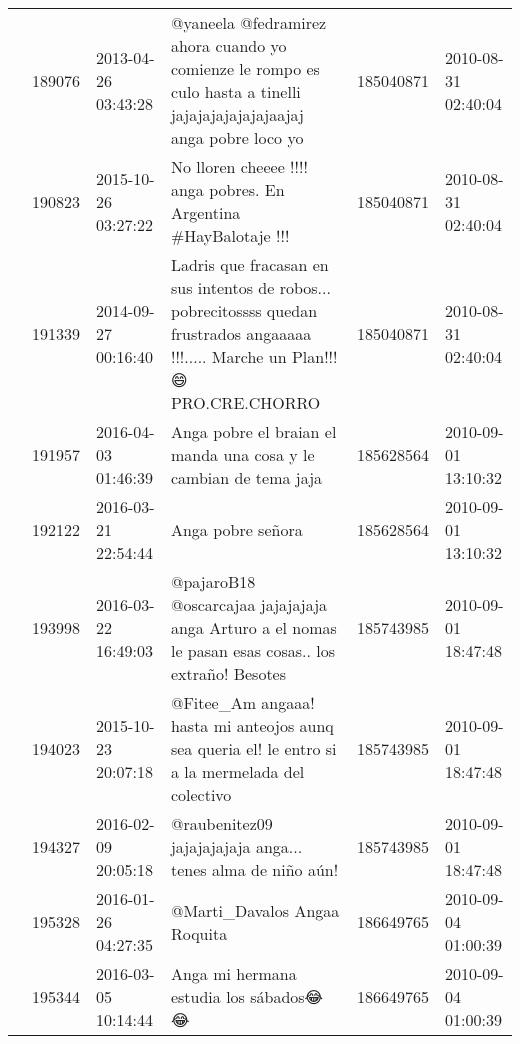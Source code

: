 \begin{tabular}{llllrl}
           & 189076  & 2013-04-26 03:43:28 &                       @yaneela @fedramirez ahora cuando yo comienze le rompo es culo hasta a tinelli jajajajajajajajaajaj anga pobre loco yo &   185040871 & 2010-08-31 02:40:04 \\
           & 190823  & 2015-10-26 03:27:22 &                                                                            No lloren cheeee !!!!  anga pobres. En Argentina \#HayBalotaje !!! &   185040871 & 2010-08-31 02:40:04 \\
           & 191339  & 2014-09-27 00:16:40 &        Ladris que fracasan en sus intentos de robos...  pobrecitossss quedan frustrados angaaaaa !!!..... Marche un Plan!!! 😄 PRO.CRE.CHORRO &   185040871 & 2010-08-31 02:40:04 \\
           & 191957  & 2016-04-03 01:46:39 &                                                                             Anga pobre el braian el manda una cosa y le cambian de tema jaja &   185628564 & 2010-09-01 13:10:32 \\
           & 192122  & 2016-03-21 22:54:44 &                                                                                                                            Anga pobre señora &   185628564 & 2010-09-01 13:10:32 \\
           & 193998  & 2016-03-22 16:49:03 &                                          @pajaroB18 @oscarcajaa jajajajaja anga Arturo a el nomas le pasan esas cosas.. los extraño! Besotes &   185743985 & 2010-09-01 18:47:48 \\
           & 194023  & 2015-10-23 20:07:18 &                                             @Fitee\_Am angaaa! hasta mi anteojos aunq sea queria el! le entro si a la mermelada del colectivo &   185743985 & 2010-09-01 18:47:48 \\
           & 194327  & 2016-02-09 20:05:18 &                                                                                   @raubenitez09 jajajajajaja anga... tenes alma de niño aún! &   185743985 & 2010-09-01 18:47:48 \\
           & 195328  & 2016-01-26 04:27:35 &                                                                                                                 @Marti\_Davalos Angaa Roquita &   186649765 & 2010-09-04 01:00:39 \\
           & 195344  & 2016-03-05 10:14:44 &                                                                                                        Anga mi hermana estudia los sábados😂😂 &   186649765 & 2010-09-04 01:00:39 \\

\end{tabular}
